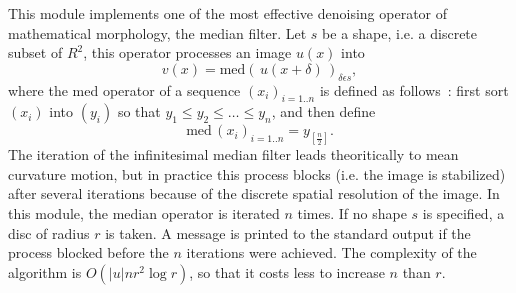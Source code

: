 This module implements one of the most effective denoising operator of 
mathematical morphology, the median filter. Let $s$ be a shape, i.e. a 
discrete subset of $R^2$, this operator processes an image $u(x)$ into
$$v(x)=\mathrm{med}\left(\,u(x+\delta)\,\right)_{\delta \epsilon s},$$
where the med operator of a sequence $(x_i)_{i=1..n}$ is defined as follows~: 
first sort $(x_i)$ into $(y_i)$ so that $y_1\leq y_2 \leq\ldots\leq y_n$, and 
then define
$$\mathrm{med}\,(x_i)_{i=1..n} = y_{[\frac{n}{2}]}.$$
The iteration of the infinitesimal median filter leads theoritically to mean 
curvature motion, but in practice this process blocks (i.e. the image is
stabilized) after several 
iterations because of the discrete spatial resolution of the image. 
In this module, the 
median operator is iterated $n$ times. If no shape $s$ is specified, a disc
of radius $r$ is taken. A message is printed to the standard output
if the process blocked before the $n$ iterations were achieved.
The complexity of the algorithm is $O(|u| n r^2 \log r)$, so that it costs
less to increase $n$ than $r$. 

